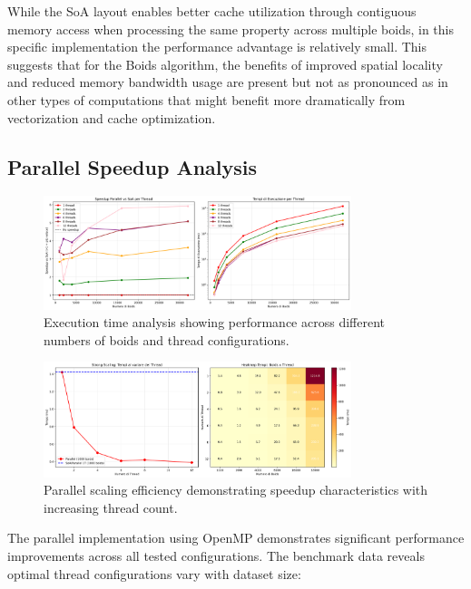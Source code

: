 \documentclass[10pt,twocolumn,letterpaper]{article}
\begin{document}
While the SoA layout enables better cache utilization through contiguous memory access when processing the same property across multiple boids, in this specific implementation the performance advantage is relatively small. This suggests that for the Boids algorithm, the benefits of improved spatial locality and reduced memory bandwidth usage are present but not as pronounced as in other types of computations that might benefit more dramatically from vectorization and cache optimization.

\subsection{Parallel Speedup Analysis}

\begin{figure}[t]
\centering
\includegraphics[width=0.8\textwidth]{../../images/parallel_analysis_performance.png}
\caption{Execution time analysis showing performance across different numbers of boids and thread configurations.}
\label{fig:performance_analysis}
\end{figure}

\begin{figure}[t]
\centering
\includegraphics[width=0.8\textwidth]{../../images/parallel_analysis_scaling.png}
\caption{Parallel scaling efficiency demonstrating speedup characteristics with increasing thread count.}
\label{fig:scaling_analysis}
\end{figure}

The parallel implementation using OpenMP demonstrates significant performance improvements across all tested configurations. The benchmark data reveals optimal thread configurations vary with dataset size:
\end{document}
